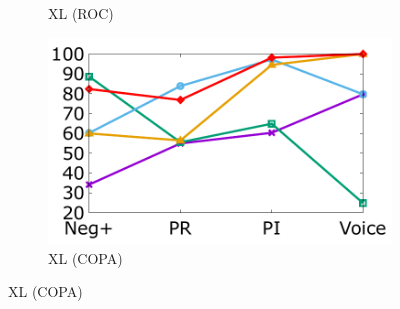 \begin{figure}[th]
\begin{subfigure}[b]{0.162\textwidth}
\caption{XL (ROC)}
\label{fig:roc_xlnet}
\end{subfigure}
\hfill
\begin{subfigure}[b]{0.162\textwidth}
\centering
\includegraphics[width=\columnwidth]{data/copa_xlnet.pdf}
\caption{XL (COPA)}
\label{fig:copa_xlnet}
\end{subfigure}

\newpage


\end{figure}
